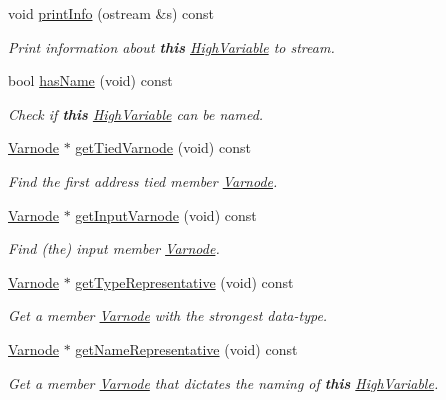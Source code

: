 \begin{DoxyCompactItemize}
void \mbox{\hyperlink{class_high_variable_a3d0f81187b11b2d9a26e6afdfc48ae6a}{print\+Info}} (ostream \&s) const
\begin{DoxyCompactList}\small\item\em Print information about {\bfseries{this}} \mbox{\hyperlink{class_high_variable}{High\+Variable}} to stream. \end{DoxyCompactList}\item 
bool \mbox{\hyperlink{class_high_variable_a7c47097883b6350cfbb630f79f529768}{has\+Name}} (void) const
\begin{DoxyCompactList}\small\item\em Check if {\bfseries{this}} \mbox{\hyperlink{class_high_variable}{High\+Variable}} can be named. \end{DoxyCompactList}\item 
\mbox{\hyperlink{class_varnode}{Varnode}} $\ast$ \mbox{\hyperlink{class_high_variable_a74c09ad2e70d4cc339af2526d529247a}{get\+Tied\+Varnode}} (void) const
\begin{DoxyCompactList}\small\item\em Find the first address tied member \mbox{\hyperlink{class_varnode}{Varnode}}. \end{DoxyCompactList}\item 
\mbox{\hyperlink{class_varnode}{Varnode}} $\ast$ \mbox{\hyperlink{class_high_variable_a7400ca6092273e5c22e8a2bf3184e698}{get\+Input\+Varnode}} (void) const
\begin{DoxyCompactList}\small\item\em Find (the) input member \mbox{\hyperlink{class_varnode}{Varnode}}. \end{DoxyCompactList}\item 
\mbox{\hyperlink{class_varnode}{Varnode}} $\ast$ \mbox{\hyperlink{class_high_variable_a843fe881b588aa75432c3b2cc03146ec}{get\+Type\+Representative}} (void) const
\begin{DoxyCompactList}\small\item\em Get a member \mbox{\hyperlink{class_varnode}{Varnode}} with the strongest data-\/type. \end{DoxyCompactList}\item 
\mbox{\hyperlink{class_varnode}{Varnode}} $\ast$ \mbox{\hyperlink{class_high_variable_ae462825b47ce6f0b17b1b40ec63dd904}{get\+Name\+Representative}} (void) const
\begin{DoxyCompactList}\small\item\em Get a member \mbox{\hyperlink{class_varnode}{Varnode}} that dictates the naming of {\bfseries{this}} \mbox{\hyperlink{class_high_variable}{High\+Variable}}. \end{DoxyCompactList}\item 

\end{DoxyCompactItemize}
